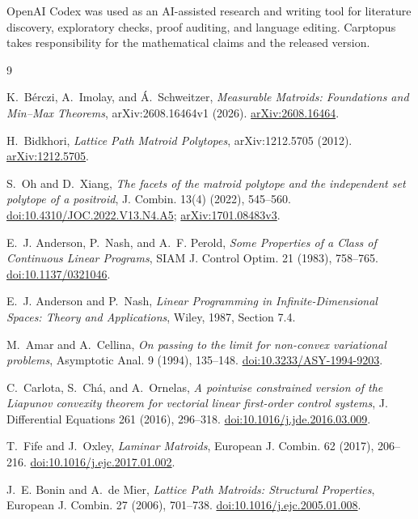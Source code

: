 \documentclass[11pt]{article}
\numberwithin{equation}{section}
\begin{document}
OpenAI Codex was used as an AI-assisted research and writing tool for literature
discovery, exploratory checks, proof auditing, and language editing. Carptopus takes
responsibility for the mathematical claims and the released version.

\begin{thebibliography}{9}
\footnotesize
\raggedright

K.~B\'erczi, A.~Imolay, and \'A.~Schweitzer,
\emph{Measurable Matroids: Foundations and Min--Max Theorems},
arXiv:2608.16464v1 (2026).
\href{https://arxiv.org/abs/2608.16464}{arXiv:2608.16464}.

H.~Bidkhori,
\emph{Lattice Path Matroid Polytopes},
arXiv:1212.5705 (2012).
\href{https://arxiv.org/abs/1212.5705}{arXiv:1212.5705}.

S.~Oh and D.~Xiang,
\emph{The facets of the matroid polytope and the independent set polytope of a positroid},
J. Combin. 13(4) (2022), 545--560.
\href{https://doi.org/10.4310/JOC.2022.V13.N4.A5}{doi:10.4310/JOC.2022.V13.N4.A5};
\href{https://arxiv.org/abs/1701.08483}{arXiv:1701.08483v3}.

E.~J. Anderson, P.~Nash, and A.~F. Perold,
\emph{Some Properties of a Class of Continuous Linear Programs},
SIAM J. Control Optim. 21 (1983), 758--765.
\href{https://doi.org/10.1137/0321046}{doi:10.1137/0321046}.

E.~J. Anderson and P.~Nash,
\emph{Linear Programming in Infinite-Dimensional Spaces: Theory and Applications},
Wiley, 1987, Section 7.4.

M.~Amar and A.~Cellina,
\emph{On passing to the limit for non-convex variational problems},
Asymptotic Anal. 9 (1994), 135--148.
\href{https://doi.org/10.3233/ASY-1994-9203}{doi:10.3233/ASY-1994-9203}.

C.~Carlota, S.~Ch\'a, and A.~Ornelas,
\emph{A pointwise constrained version of the Liapunov convexity theorem for vectorial linear first-order control systems},
J. Differential Equations 261 (2016), 296--318.
\href{https://doi.org/10.1016/j.jde.2016.03.009}{doi:10.1016/j.jde.2016.03.009}.

T.~Fife and J.~Oxley,
\emph{Laminar Matroids},
European J. Combin. 62 (2017), 206--216.
\href{https://doi.org/10.1016/j.ejc.2017.01.002}{doi:10.1016/j.ejc.2017.01.002}.

J.~E. Bonin and A.~de Mier,
\emph{Lattice Path Matroids: Structural Properties},
European J. Combin. 27 (2006), 701--738.
\href{https://doi.org/10.1016/j.ejc.2005.01.008}{doi:10.1016/j.ejc.2005.01.008}.

\end{thebibliography}
\end{document}
